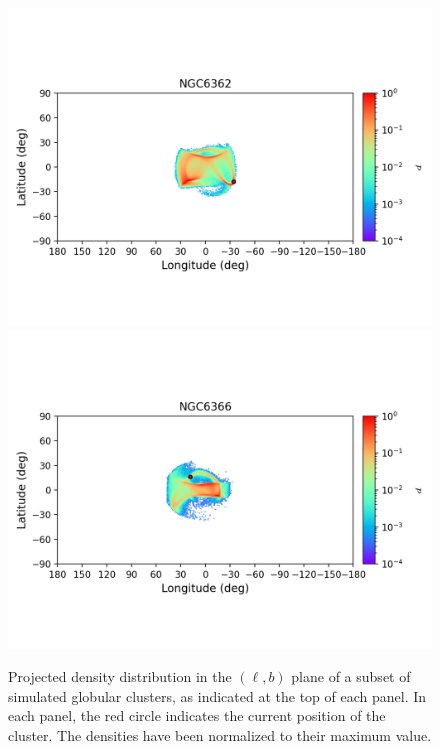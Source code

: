 \begin{figure}
\begin{center}
                \includegraphics[clip=true, trim = 0mm 20mm 0mm 10mm, width=1\columnwidth]{images/error_plots_NGC6362.png}
                \includegraphics[clip=true, trim = 0mm 20mm 0mm 10mm, width=1\columnwidth]{images/error_plots_NGC6366.png}
            \end{center}
            \caption[]{Projected density distribution in the $(\ell, b)$ plane of a subset of simulated globular clusters, as indicated at the top of each panel. In each panel, the red circle indicates the current position of the cluster. The densities have been normalized to their maximum value.}\label{stream10}
        \end{figure}
        
